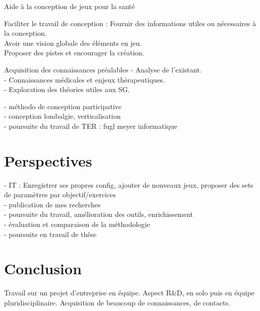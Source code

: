\documentclass{beamer}
\begin{document}
		\begin{frame}{Aide à la conception de jeux pour la santé}
			\begin{exampleblock}{Faciliter le travail de conception :}
			Fournir des informations utiles ou nécessaires à la conception.\\
			Avoir une vision globale des éléments en jeu.\\
			Proposer des pistes et encourager la création.
			\end{exampleblock}\pause
			
			\begin{block}{Acquisition des connaissances préalables}
				- Analyse de l'existant.\\
				- Connaissances médicales et enjeux thérapeutiques.\\
				- Exploration des théories utiles aux SG.				
			\end{block}
		\end{frame}
	
		\begin{frame}
			- méthodo de conception participative\\
			- conception lombalgie, verticalisation\\
			- poursuite du travail de TER : fugl meyer informatique
		\end{frame}
	
	\section{Perspectives}
		\begin{frame}
		 	- IT : Enregistrer ses propres config, ajouter de nouveaux jeux, proposer des sets de paramètres par objectif/exercices\\
			- publication de mes recherches\\
			- poursuite du travail, amélioration des outils, enrichissement\\
			- évaluation et comparaison de la méthodologie\\
			- poursuite en travail de thèse
		\end{frame}
	
	\section{Conclusion}
		\begin{frame}
			Travail sur un projet d'entreprise en équipe.
			Aspect R\&D, en solo puis en équipe pluridisciplinaire.
			Acquisition de beaucoup de connaissances, de contacts.
		\end{frame}
\end{document}
